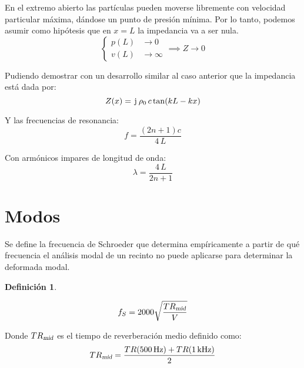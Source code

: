 \documentclass[a5paper,12pt,twoside]{book}
\newtheorem{defn}{{Definición}}[chapter]
\begin{document}
\begin{center}
    \def\svgwidth{0.6\linewidth}
    
\end{center}

En el extremo abierto las partículas pueden moverse libremente con velocidad particular máxima, dándose un punto de presión mínima.
Por lo tanto, podemos asumir como hipótesis que en $x=L$ la impedancia va a ser nula.
\begin{equation*}
    \left\{
    \begin{aligned}
        p(L) &\to 0
        \\
        v(L) &\to \infty
    \end{aligned}
    \right.
    \implies
    Z \to 0
\end{equation*}

Pudiendo demostrar con un desarrollo similar al caso anterior que la impedancia está dada por:
\begin{equation}
    Z(x) = \mkern2mu\mathrm{j}\mkern1mu \, \rho_0 \, c \tan (kL-kx)
\end{equation}

Y las frecuencias de resonancia:
\begin{equation}
    f = \frac{\left( 2n+1 \right) c}{4 \, L}
\end{equation}

Con armónicos impares de longitud de onda:
\begin{equation}
    \lambda = \frac{4 \, L}{2n + 1}
\end{equation}


\section{Modos}

Se define la frecuencia de Schroeder que determina empíricamente a partir de qué frecuencia el análisis modal de un recinto no puede aplicarse para determinar la deformada modal.

\begin{mdframed}[style=DefinitionFrame]
    \begin{defn}
    \end{defn}
    \begin{equation*}
        f_S = 2000 \sqrt{\frac{{{TR}_\textsl{{mid}}}}{V}}
    \end{equation*}
\end{mdframed}

Donde ${{TR}_\textsl{{mid}}}$ es el tiempo de reverberación medio definido como:
\begin{equation*}
    {{TR}_\textsl{{mid}}} = \frac{TR(500\,\si{\hertz})+TR(1\,\si{\kilo\hertz})}{2}
\end{equation*}
\end{document}
